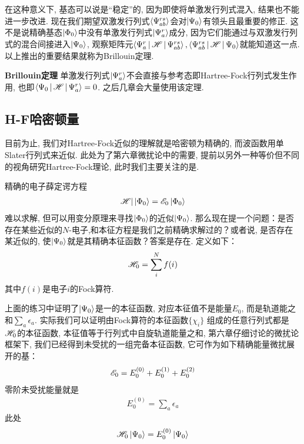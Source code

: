 在这种意义下, \hft 基态可以说是“稳定”的, 因为即使将单激发行列式混入, 结果也不能进一步改进. 现在我们期望双激发行列式$\Braket{\Psi_{ab}^{rs}}$会对$\Ket{\Psi_0}$有领头且最重要的修正. 这不是说精确基态$\Ket{\Phi_0}$中没有单激发行列式$\Ket{\Psi_a^r}$成分, 因为它们能通过与双激发行列式的混合间接进入$\Ket{\Psi_0}$, 观察矩阵元$\Braket{\Psi_a^r|\mathscr{H}|\Psi_{ab}^{rs}},\Braket{\Psi_{ab}^{rs}|\mathscr{H}|\Psi_0}$就能知道这一点. 以上推出的重要结果就称为Brillouin定理. 

\textbf{Brillouin定理} 单激发行列式$\Ket{\Psi_a^r}$不会直接与参考态即Hartree-Fock行列式发生作用, 也即$\Braket{\Psi_0|\mathscr{H}|\Psi_a^r}=0$. 之后几章会大量使用该定理.
\subsection{H-F哈密顿量}
目前为止, 我们对Hartree-Fock近似的理解就是哈密顿为精确的, 而波函数用单Slater行列式来近似. 此处为了第六章微扰论中的需要, 提前以另外一种等价但不同的视角研究Hartree-Fock理论, 此时我们主要关注的是\ha.

精确的电子薛定谔方程
\begin{align}
\mathscr{H}|\Ket{\Phi_0} = \mathscr{E}_0\Ket{\Phi_0}
\end{align}难以求解, 但可以用变分原理来寻找$\Ket{\Phi_0}$的近似$\Ket{\Psi_0}$. 那么现在提一个问题：是否存在某些近似的$N$-电子\ha,和本征方程是我们之前精确求解过的？或者说, 是否存在某近似的\ha, 使$\Ket{\Psi_0}$就是其精确本征函数？答案是存在. \emph{\hft \ha}定义如下：
\begin{align}
\mathscr{H}_0 = \sum_i^Nf(i)
\end{align}
其中$f(i)是$电子$i$的Fock算符.

上面的练习中证明了$\Ket{\Psi_0}$是一\hft\ha 的本征函数, 对应本征值不是\hft 能量$E_0$, 而是轨道能之和$\sum_a\epsilon_a$. 实际我们可以证明由Fock算符的本征函数$\{\chi_i\}$ 组成的任意行列式都是$\mathscr{H}_0$的本征函数, 本征值等于行列式中自旋轨道能量之和, 第六章仔细讨论的微扰论框架下, 我们已经得到未受扰\ha 的一组完备本征函数, 它可作为如下精确能量微扰展开的基：
\begin{align}
\label{3.104}
\mathscr{E}_0 = E_0^{(0)} + E_0^{(1)} + E_0^{(2)}
\end{align}
零阶未受扰能量就是
\begin{align}
E_0^{(0)} = \sum_a\epsilon_a
\end{align}
此处
\begin{equation}
\mathscr{H}_0\Ket{\Psi_0}=E_0^{(0)}\Ket{\Psi_0}
\end{equation}

